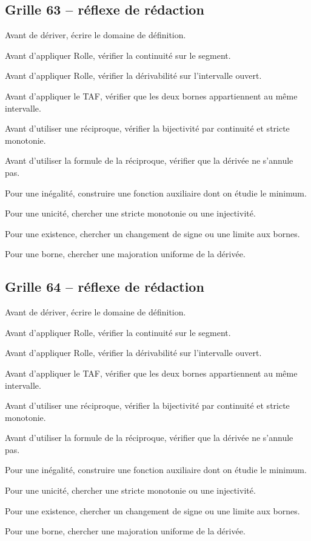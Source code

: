\documentclass[11pt,a4paper]{article}
\begin{document}
\subsection*{Grille 63 -- réflexe de rédaction}

\begin{methodebox}

Avant de dériver, écrire le domaine de définition.

Avant d'appliquer Rolle, vérifier la continuité sur le segment.

Avant d'appliquer Rolle, vérifier la dérivabilité sur l'intervalle ouvert.

Avant d'appliquer le TAF, vérifier que les deux bornes appartiennent au même intervalle.

Avant d'utiliser une réciproque, vérifier la bijectivité par continuité et stricte monotonie.

Avant d'utiliser la formule de la réciproque, vérifier que la dérivée ne s'annule pas.

Pour une inégalité, construire une fonction auxiliaire dont on étudie le minimum.

Pour une unicité, chercher une stricte monotonie ou une injectivité.

Pour une existence, chercher un changement de signe ou une limite aux bornes.

Pour une borne, chercher une majoration uniforme de la dérivée.

\end{methodebox}

\subsection*{Grille 64 -- réflexe de rédaction}

\begin{methodebox}

Avant de dériver, écrire le domaine de définition.

Avant d'appliquer Rolle, vérifier la continuité sur le segment.

Avant d'appliquer Rolle, vérifier la dérivabilité sur l'intervalle ouvert.

Avant d'appliquer le TAF, vérifier que les deux bornes appartiennent au même intervalle.

Avant d'utiliser une réciproque, vérifier la bijectivité par continuité et stricte monotonie.

Avant d'utiliser la formule de la réciproque, vérifier que la dérivée ne s'annule pas.

Pour une inégalité, construire une fonction auxiliaire dont on étudie le minimum.

Pour une unicité, chercher une stricte monotonie ou une injectivité.

Pour une existence, chercher un changement de signe ou une limite aux bornes.

Pour une borne, chercher une majoration uniforme de la dérivée.

\end{methodebox}
\end{document}
